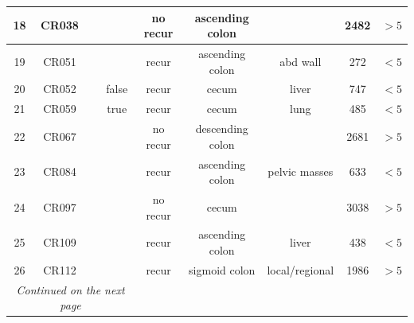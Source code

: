 \begin{table}
\begin{longtable}{|c|c|c|c|c|c|c|c|c|}
\hline
18 & CR038 &  &  & no recur & ascending colon &  & 2482 & $>5$ \\
\hline
19 & CR051 &  &  & recur & ascending colon & abd wall & 272 & $<5$ \\
\hline
20 & CR052 &  & false & recur & cecum & liver & 747 & $<5$ \\
\hline
21 & CR059 &  & true & recur & cecum & lung & 485 & $<5$ \\
\hline
22 & CR067 & & & no recur & descending colon &  & 2681 & $>5$ \\
\hline
23 & CR084 & & & recur & ascending colon & pelvic masses & 633 & $<5$ \\

\hline
24 & CR097 & & & no recur & cecum &  & 3038 & $>5$ \\
\hline
25 & CR109 & & & recur & ascending colon & liver & 438 & $<5$ \\
\hline
26 & CR112 & & & recur & sigmoid colon & local/regional & 1986 & $>5$ \\
\hline
\multicolumn{4}{c}{\textit{Continued on the next page}} \\
  \end{longtable}
  \label{table:Chapt4_IMC_patient_metadata}
\end{table}

